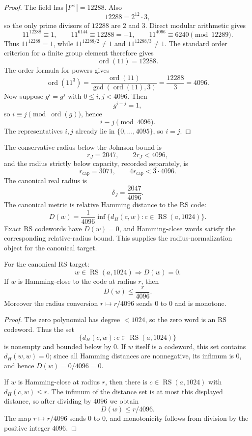 \begin{proof}
The field has \(|F^\times|=12288\). Also
\[
  12288=2^{12}\cdot3,
\]
so the only prime divisors of \(12288\) are \(2\) and \(3\). Direct modular
arithmetic gives
\[
  11^{12288}\equiv1,\qquad
  11^{6144}\equiv12288=-1,\qquad
  11^{4096}\equiv6240
  \pmod{12289}.
\]
Thus \(11^{12288}=1\), while \(11^{12288/2}\ne1\) and
\(11^{12288/3}\ne1\). The standard order criterion for a finite group element
therefore gives
\[
  \operatorname{ord}(11)=12288.
\]
The order formula for powers gives
\[
  \operatorname{ord}(11^3)
  =
  \frac{\operatorname{ord}(11)}{\gcd(\operatorname{ord}(11),3)}
  =\frac{12288}{3}
  =
  4096.
\]
Now suppose \(g^i=g^j\) with
\(0\le i,j<4096\). Then
\[
  g^{i-j}=1,
\]
so \(i\equiv j\pmod{\operatorname{ord}(g)}\), hence
\[
  i\equiv j\pmod{4096}.
\]
The representatives \(i,j\) already lie in \(\{0,\ldots,4095\}\), so \(i=j\).
\end{proof}

The conservative radius below the Johnson bound is
\[
  r_J=2047,\qquad 2r_J<4096,
\]
and the radius strictly below capacity, recorded separately, is
\[
  r_{\mathrm{cap}}=3071,\qquad
  4r_{\mathrm{cap}}<3\cdot4096.
\]
The canonical real radius is
\[
  \delta_J=\frac{2047}{4096}.
\]
The canonical metric is relative Hamming distance to the RS code:
\[
  D(w)=\frac{1}{4096}\inf\{d_H(c,w):c\in \operatorname{RS}(a,1024)\}.
\]
Exact RS codewords have \(D(w)=0\), and Hamming-close words satisfy the
corresponding relative-radius bound. This supplies the radius-normalization
object for the canonical target.

\begin{proposition}\label{prop:canonical-metric}
For the canonical RS target:
\[
  w\in\operatorname{RS}(a,1024)\Longrightarrow D(w)=0.
\]
If \(w\) is Hamming-close to the code at radius \(r\), then
\[
  D(w)\le \frac r{4096}.
\]
Moreover the radius conversion \(r\mapsto r/4096\) sends \(0\) to \(0\) and is
monotone.
\end{proposition}

\begin{proof}
The zero polynomial has degree \(<1024\), so the zero word is an RS codeword.
Thus the set
\[
  \{d_H(c,w):c\in\operatorname{RS}(a,1024)\}
\]
is nonempty and bounded below by \(0\). If \(w\) itself is a codeword, this set
contains \(d_H(w,w)=0\); since all Hamming distances are nonnegative, its
infimum is \(0\), and hence \(D(w)=0/4096=0\).

If \(w\) is Hamming-close at radius \(r\), then there is
\(c\in\operatorname{RS}(a,1024)\) with \(d_H(c,w)\le r\). The infimum of the
distance set is at most this displayed distance, so after dividing by \(4096\)
we obtain
\[
  D(w)\le r/4096.
\]
The map \(r\mapsto r/4096\) sends \(0\) to \(0\), and monotonicity follows from
division by the positive integer \(4096\).
\end{proof}

